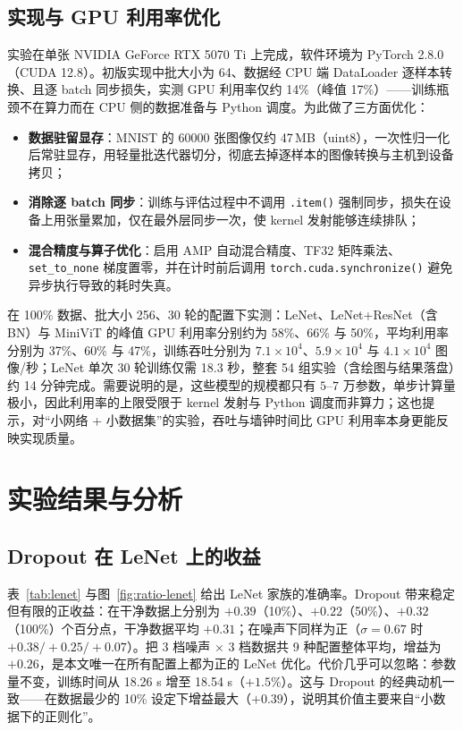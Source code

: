 \documentclass[12pt,hyperref,a4paper,UTF8]{ctexart}
\begin{document}
\subsection{实现与 GPU 利用率优化}
实验在单张 NVIDIA GeForce RTX 5070 Ti 上完成，软件环境为 PyTorch 2.8.0（CUDA 12.8）。初版实现中批大小为 64、数据经 CPU 端 DataLoader 逐样本转换、且逐 batch 同步损失，实测 GPU 利用率仅约 14\%（峰值 17\%）——训练瓶颈不在算力而在 CPU 侧的数据准备与 Python 调度。为此做了三方面优化：
\begin{itemize}
    \item \textbf{数据驻留显存}：MNIST 的 60000 张图像仅约 47\,MB（uint8），一次性归一化后常驻显存，用轻量批迭代器切分，彻底去掉逐样本的图像转换与主机到设备拷贝；
    \item \textbf{消除逐 batch 同步}：训练与评估过程中不调用 \texttt{.item()} 强制同步，损失在设备上用张量累加，仅在最外层同步一次，使 kernel 发射能够连续排队；
    \item \textbf{混合精度与算子优化}：启用 AMP 自动混合精度、TF32 矩阵乘法、\texttt{set\_to\_none} 梯度置零，并在计时前后调用 \texttt{torch.cuda.synchronize()} 避免异步执行导致的耗时失真。
\end{itemize}
在 100\% 数据、批大小 256、30 轮的配置下实测：LeNet、LeNet+ResNet（含 BN）与 MiniViT 的峰值 GPU 利用率分别约为 58\%、66\% 与 50\%，平均利用率分别为 37\%、60\% 与 47\%，训练吞吐分别为 $7.1\times10^{4}$、$5.9\times10^{4}$ 与 $4.1\times10^{4}$ 图像/秒；LeNet 单次 30 轮训练仅需 18.3 秒，整套 54 组实验（含绘图与结果落盘）约 14 分钟完成。需要说明的是，这些模型的规模都只有 $5$--$7$ 万参数，单步计算量极小，因此利用率的上限受限于 kernel 发射与 Python 调度而非算力；这也提示，对“小网络 + 小数据集”的实验，吞吐与墙钟时间比 GPU 利用率本身更能反映实现质量。

\section{实验结果与分析}

\subsection{Dropout 在 LeNet 上的收益}
表~\ref{tab:lenet} 与图~\ref{fig:ratio-lenet} 给出 LeNet 家族的准确率。Dropout 带来稳定但有限的正收益：在干净数据上分别为 $+0.39$（10\%）、$+0.22$（50\%）、$+0.32$（100\%）个百分点，干净数据平均 $+0.31$；在噪声下同样为正（$\sigma=0.67$ 时 $+0.38/+0.25/+0.07$）。把 3 档噪声 $\times$ 3 档数据共 9 种配置整体平均，增益为 $+0.26$，是本文唯一在所有配置上都为正的 LeNet 优化。代价几乎可以忽略：参数量不变，训练时间从 18.26 s 增至 18.54 s（$+1.5\%$）。这与 Dropout 的经典动机一致——在数据最少的 10\% 设定下增益最大（$+0.39$），说明其价值主要来自“小数据下的正则化”。
\end{document}
